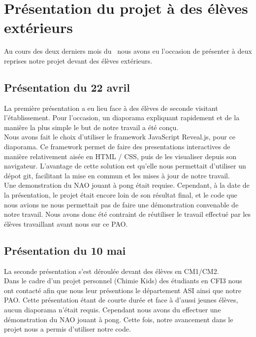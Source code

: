 \section{Présentation du projet à des élèves extérieurs}
\label{sec:Présentation du projet à des élèves extérieurs}
  \par Au cours des deux derniers mois du \pao\ nous avons eu l'occasion de présenter à deux reprises notre projet devant des élèves extérieurs.\\

  \subsection{Présentation du 22 avril}
  \label{sub:Présentation du 22 avril}
    \par La première présentation a eu lieu face à des élèves de seconde visitant l'établissement.
    Pour l'occasion, un diaporama expliquant rapidement et de la manière la plus simple le but de notre travail a été conçu.\\
    Nous avons fait le choix d'utiliser le framework JavaScript Reveal.js, pour ce diaporama.
    Ce framework permet de faire des presentations interactives de manière relativement aisée en HTML / CSS, puis de les visualiser depuis son navigateur.
    L'avantage de cette solution est qu'elle nous permettait d'utiliser un dépot git, facilitant la mise en commun et les mises à jour de notre travail.\\
    Une demonstration du NAO jouant à pong était requise.
    Cependant, à la date de la présentation, le projet était encore loin de son résultat final, et le code que nous avions ne nous permettait pas de faire une démonstration convenable de notre travail.
    Nous avons donc été contraint de réutiliser le travail effectué par les élèves travaillant avant nous sur ce PAO.\\

  \subsection{Présentation du 10 mai}
  \label{sub:Présentation du 10 mai}
    \par La seconde présentation s'est déroulée devant des élèves en CM1/CM2. \\
    Dans le cadre d'un projet personnel (Chimie Kids) des étudiants en CFI3 nous ont contacté afin que nous leur présentions le département ASI ainsi que notre PAO.
    Cette présentation étant de courte durée et face à d'aussi jeunes élèves, aucun diaporama n'était requis.
    Cependant nous avons du effectuer une démonstration du NAO jouant à pong.
    Cette fois, notre avancement dans le projet nous a permis d'utiliser notre code.
\pagebreak
